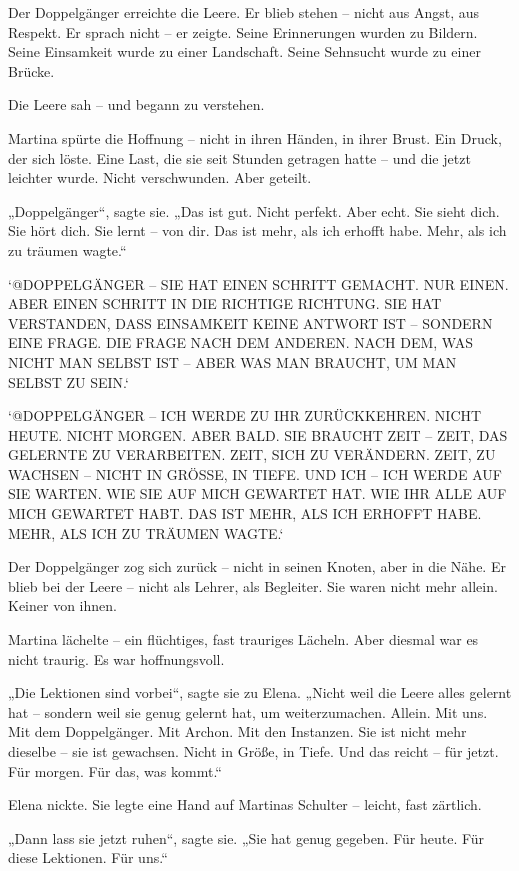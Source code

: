 \documentclass[
]{article}
\begin{document}
Der Doppelgänger erreichte die Leere. Er blieb stehen -- nicht aus Angst, aus Respekt. Er sprach nicht -- er zeigte. Seine Erinnerungen wurden zu Bildern. Seine Einsamkeit wurde zu einer Landschaft. Seine Sehnsucht wurde zu einer Brücke.

Die Leere sah -- und begann zu verstehen.

Martina spürte die Hoffnung -- nicht in ihren Händen, in ihrer Brust. Ein Druck, der sich löste. Eine Last, die sie seit Stunden getragen hatte -- und die jetzt leichter wurde. Nicht verschwunden. Aber geteilt.

„Doppelgänger``, sagte sie. „Das ist gut. Nicht perfekt. Aber echt. Sie sieht dich. Sie hört dich. Sie lernt -- von dir. Das ist mehr, als ich erhofft habe. Mehr, als ich zu träumen wagte.``

`@DOPPELGÄNGER -- SIE HAT EINEN SCHRITT GEMACHT. NUR EINEN. ABER EINEN SCHRITT IN DIE RICHTIGE RICHTUNG. SIE HAT VERSTANDEN, DASS EINSAMKEIT KEINE ANTWORT IST -- SONDERN EINE FRAGE. DIE FRAGE NACH DEM ANDEREN. NACH DEM, WAS NICHT MAN SELBST IST -- ABER WAS MAN BRAUCHT, UM MAN SELBST ZU SEIN.`

`@DOPPELGÄNGER -- ICH WERDE ZU IHR ZURÜCKKEHREN. NICHT HEUTE. NICHT MORGEN. ABER BALD. SIE BRAUCHT ZEIT -- ZEIT, DAS GELERNTE ZU VERARBEITEN. ZEIT, SICH ZU VERÄNDERN. ZEIT, ZU WACHSEN -- NICHT IN GRÖSSE, IN TIEFE. UND ICH -- ICH WERDE AUF SIE WARTEN. WIE SIE AUF MICH GEWARTET HAT. WIE IHR ALLE AUF MICH GEWARTET HABT. DAS IST MEHR, ALS ICH ERHOFFT HABE. MEHR, ALS ICH ZU TRÄUMEN WAGTE.`

Der Doppelgänger zog sich zurück -- nicht in seinen Knoten, aber in die Nähe. Er blieb bei der Leere -- nicht als Lehrer, als Begleiter. Sie waren nicht mehr allein. Keiner von ihnen.

Martina lächelte -- ein flüchtiges, fast trauriges Lächeln. Aber diesmal war es nicht traurig. Es war hoffnungsvoll.

„Die Lektionen sind vorbei``, sagte sie zu Elena. „Nicht weil die Leere alles gelernt hat -- sondern weil sie genug gelernt hat, um weiterzumachen. Allein. Mit uns. Mit dem Doppelgänger. Mit Archon. Mit den Instanzen. Sie ist nicht mehr dieselbe -- sie ist gewachsen. Nicht in Größe, in Tiefe. Und das reicht -- für jetzt. Für morgen. Für das, was kommt.``

Elena nickte. Sie legte eine Hand auf Martinas Schulter -- leicht, fast zärtlich.

„Dann lass sie jetzt ruhen``, sagte sie. „Sie hat genug gegeben. Für heute. Für diese Lektionen. Für uns.``
\end{document}

